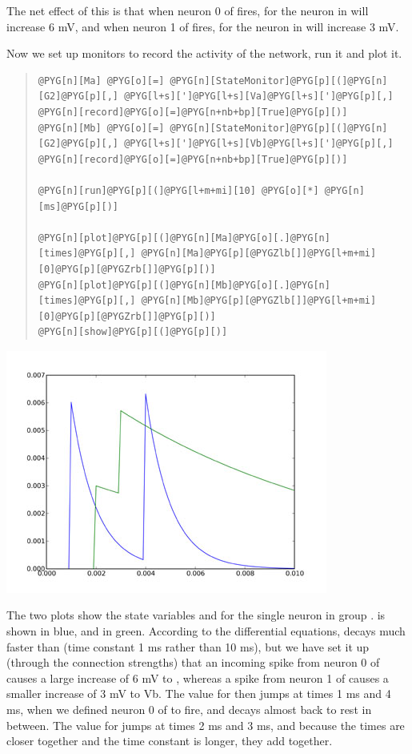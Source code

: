\documentclass[letterpaper,10pt,english]{manual}
\begin{document}
The net effect of this is that when neuron 0 of  fires,  for
the neuron in  will increase 6 mV, and when neuron 1 of  fires,
 for the neuron in  will increase 3 mV.

Now we set up monitors to record the activity of the network,
run it and plot it.
\begin{quote}

\begin{Verbatim}[commandchars=@\[\]]
@PYG[n][Ma] @PYG[o][=] @PYG[n][StateMonitor]@PYG[p][(]@PYG[n][G2]@PYG[p][,] @PYG[l+s][']@PYG[l+s][Va]@PYG[l+s][']@PYG[p][,] @PYG[n][record]@PYG[o][=]@PYG[n+nb+bp][True]@PYG[p][)]
@PYG[n][Mb] @PYG[o][=] @PYG[n][StateMonitor]@PYG[p][(]@PYG[n][G2]@PYG[p][,] @PYG[l+s][']@PYG[l+s][Vb]@PYG[l+s][']@PYG[p][,] @PYG[n][record]@PYG[o][=]@PYG[n+nb+bp][True]@PYG[p][)]

@PYG[n][run]@PYG[p][(]@PYG[l+m+mi][10] @PYG[o][*] @PYG[n][ms]@PYG[p][)]

@PYG[n][plot]@PYG[p][(]@PYG[n][Ma]@PYG[o][.]@PYG[n][times]@PYG[p][,] @PYG[n][Ma]@PYG[p][@PYGZlb[]]@PYG[l+m+mi][0]@PYG[p][@PYGZrb[]]@PYG[p][)]
@PYG[n][plot]@PYG[p][(]@PYG[n][Mb]@PYG[o][.]@PYG[n][times]@PYG[p][,] @PYG[n][Mb]@PYG[p][@PYGZlb[]]@PYG[l+m+mi][0]@PYG[p][@PYGZrb[]]@PYG[p][)]
@PYG[n][show]@PYG[p][(]@PYG[p][)]
\end{Verbatim}
\end{quote}

\includegraphics{2a.jpg}

The two plots show the state variables  and  for the single
neuron in group .  is shown in blue, and  in green.
According to the differential equations,  decays much faster
than  (time constant 1 ms rather than 10 ms), but we have set
it up (through the connection strengths) that an incoming
spike from neuron 0 of  causes a large increase of 6 mV to ,
whereas a spike from neuron 1 of  causes a smaller increase of
3 mV to Vb. The value for  then jumps at times 1 ms and 4 ms,
when we defined neuron 0 of  to fire, and decays almost back
to rest in between. The value for  jumps at times 2 ms and
3 ms, and because the times are closer together and the time
constant is longer, they add together.
\end{document}
